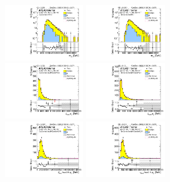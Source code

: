 \begin{figure}[htbp!]
\begin{center}
\includegraphics[width=0.31\textwidth,angle=-90]{figures/boosted/Prereweight/Moriond_ThreeTag_Control_mHH_l_1.pdf}
\includegraphics[width=0.31\textwidth,angle=-90]{figures/boosted/Control/b77_ThreeTag_Control_mHH_l_1.pdf}\\
\includegraphics[width=0.31\textwidth,angle=-90]{figures/boosted/Prereweight/Moriond_ThreeTag_Control_leadHCand_Pt_m.pdf}
\includegraphics[width=0.31\textwidth,angle=-90]{figures/boosted/Control/b77_ThreeTag_Control_leadHCand_Pt_m.pdf}\\
\includegraphics[width=0.31\textwidth,angle=-90]{figures/boosted/Prereweight/Moriond_ThreeTag_Control_leadHCand_trk0_Pt.pdf}
\includegraphics[width=0.31\textwidth,angle=-90]{figures/boosted/Control/b77_ThreeTag_Control_leadHCand_trk0_Pt.pdf}\\

\end{center}
\end{figure}
